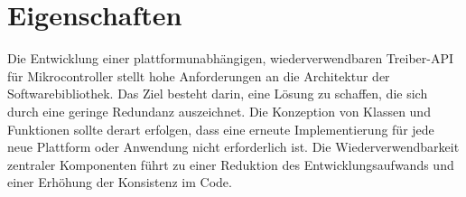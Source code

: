 \section{Eigenschaften}

Die Entwicklung einer plattformunabhängigen, wiederverwendbaren Treiber-API für Mikrocontroller stellt hohe Anforderungen an die Architektur der Softwarebibliothek.
Das Ziel besteht darin, eine Lösung zu schaffen, die sich durch eine geringe Redundanz auszeichnet. 
Die Konzeption von Klassen und Funktionen sollte derart erfolgen, dass eine erneute Implementierung für jede neue Plattform oder Anwendung nicht erforderlich ist.
Die Wiederverwendbarkeit zentraler Komponenten führt zu einer Reduktion des Entwicklungsaufwands und einer Erhöhung der Konsistenz im Code.

